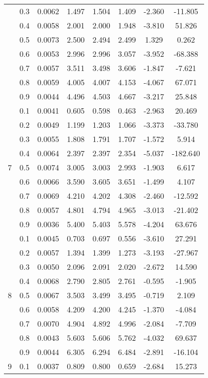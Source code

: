 \documentclass[11pt,a4paper]{report}
\begin{document}
\begin{longtable}{ | c | c || c | c | c | c | c | c | }
 & 0.3 & 0.0062 & 1.497 & 1.504 & 1.409 & -2.360 & -11.805 \\
 & 0.4 & 0.0058 & 2.001 & 2.000 & 1.948 & -3.810 & 51.826 \\
 & 0.5 & 0.0073 & 2.500 & 2.494 & 2.499 & 1.329 & 0.262 \\
 & 0.6 & 0.0053 & 2.996 & 2.996 & 3.057 & -3.952 & -68.388 \\
 & 0.7 & 0.0057 & 3.511 & 3.498 & 3.606 & -1.847 & -7.621 \\
 & 0.8 & 0.0059 & 4.005 & 4.007 & 4.153 & -4.067 & 67.071 \\
 & 0.9 & 0.0044 & 4.496 & 4.503 & 4.667 & -3.217 & 25.848 \\
 \hline
\multirow{9}{*}{7} & 0.1 & 0.0041 & 0.605 & 0.598 & 0.463 & -2.963 & 20.469 \\
 & 0.2 & 0.0049 & 1.199 & 1.203 & 1.066 & -3.373 & -33.780 \\
 & 0.3 & 0.0055 & 1.808 & 1.791 & 1.707 & -1.572 & 5.914 \\
 & 0.4 & 0.0064 & 2.397 & 2.397 & 2.354 & -5.037 & -182.640 \\
 & 0.5 & 0.0074 & 3.005 & 3.003 & 2.993 & -1.903 & 6.617 \\
 & 0.6 & 0.0066 & 3.590 & 3.605 & 3.651 & -1.499 & 4.107 \\
 & 0.7 & 0.0069 & 4.210 & 4.202 & 4.308 & -2.460 & -12.592 \\
 & 0.8 & 0.0057 & 4.801 & 4.794 & 4.965 & -3.013 & -21.402 \\
 & 0.9 & 0.0036 & 5.400 & 5.403 & 5.578 & -4.204 & 63.676 \\
 \hline
\multirow{9}{*}{8} & 0.1 & 0.0045 & 0.703 & 0.697 & 0.556 & -3.610 & 27.291 \\
 & 0.2 & 0.0057 & 1.394 & 1.399 & 1.273 & -3.193 & -27.967 \\
 & 0.3 & 0.0050 & 2.096 & 2.091 & 2.020 & -2.672 & 14.590 \\
 & 0.4 & 0.0068 & 2.790 & 2.805 & 2.761 & -0.595 & -1.905 \\
 & 0.5 & 0.0067 & 3.503 & 3.499 & 3.495 & -0.719 & 2.109 \\
 & 0.6 & 0.0058 & 4.209 & 4.200 & 4.245 & -1.370 & -4.084 \\
 & 0.7 & 0.0070 & 4.904 & 4.892 & 4.996 & -2.084 & -7.709 \\
 & 0.8 & 0.0043 & 5.603 & 5.606 & 5.762 & -4.032 & 69.637 \\
 & 0.9 & 0.0044 & 6.305 & 6.294 & 6.484 & -2.891 & -16.104 \\
 \hline
\multirow{9}{*}{9} & 0.1 & 0.0037 & 0.809 & 0.800 & 0.659 & -2.684 & 15.273 \\

\end{longtable}
\end{document}
